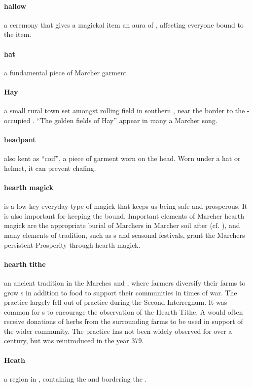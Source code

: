 \paragraph{hallow} a ceremony that gives a magickal item an aura of , affecting everyone bound to the item.
\paragraph{hat} a fundamental piece of Marcher garment 
\paragraph{Hay} a small rural town set amongst rolling field in southern , near the border to the -occupied . “The golden fields of Hay” appear in many a Marcher song.
\paragraph{headpant} also kent as “coif”, a piece of garment worn on the head. Worn under a hat or helmet, it can prevent chafing.
\paragraph{hearth magick} is a low-key everyday type of magick that keeps us being safe and prosperous. It is also important for keeping the  bound. Important elements of Marcher hearth magick are the appropriate burial of Marchers in Marcher soil after  (cf. ), and many elements of tradition, such as s and seasonal festivals, grant the Marchers persistent Prosperity through hearth magick.
\paragraph{hearth tithe} an ancient tradition in the Marches and , where farmers diversify their farms to grow s in addition to food to support their communities in times of war. The practice largely fell out of practice during the Second Interregnum. It was common for s to encourage the observation of the Hearth Tithe. A  would often receive donations of herbs from the surrounding farms to be used in support of the wider community. The practice has not been widely observed for over a century, but was reintroduced in the year 379.
\paragraph{Heath} a region in , containing the  and bordering the .
